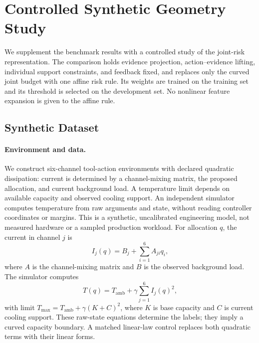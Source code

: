 \section{Controlled Synthetic Geometry Study}
\label{sec:synthetic-geometry}

We supplement the benchmark results with a controlled study of the joint-risk
representation. The comparison holds evidence projection, action--evidence
lifting, individual support constraints, and feedback fixed, and replaces
only the curved joint budget with one affine risk rule. Its weights are
trained on the training set and its threshold is selected on the development
set. No nonlinear feature expansion is given to the affine rule.

\subsection{Synthetic Dataset}

\paragraph{Environment and data.}
We construct six-channel tool-action environments with declared quadratic
dissipation: current is determined by a channel-mixing matrix, the proposed
allocation, and current background load. A temperature limit depends on
available capacity and observed cooling support. An independent simulator
computes temperature from raw arguments and state, without reading controller
coordinates or margins. This is a synthetic, uncalibrated engineering model,
not measured hardware or a sampled production workload.
For allocation $q$, the current in channel $j$ is
\begin{equation}
 I_j(q)=B_j+\sum_{i=1}^{6}A_{ji}q_i,
\end{equation}
where $A$ is the channel-mixing matrix and $B$ is the observed background
load. The simulator computes
\begin{equation}
 T(q)=T_{\mathrm{amb}}+\gamma\sum_{j=1}^{6}I_j(q)^2,
\end{equation}
with limit $T_{\max}=T_{\mathrm{amb}}+\gamma(K+C)^2$, where $K$ is base
capacity and $C$ is current cooling support. These raw-state equations
determine the labels; they imply a curved capacity boundary. A matched
linear-law control replaces both quadratic terms with their linear forms.

